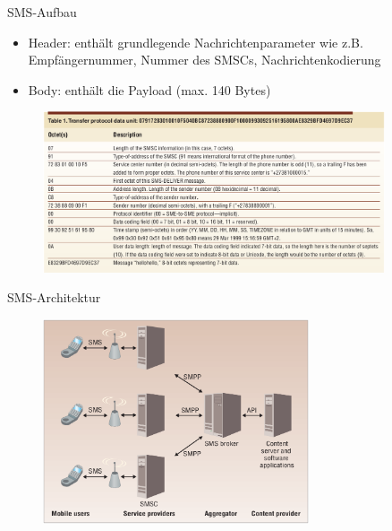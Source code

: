 \documentclass{beamer}
\begin{document}
\begin{frame}{SMS-Aufbau}
	\begin{itemize}
		\item Header: enthält grundlegende Nachrichtenparameter wie z.B. 
			Empfängernummer, Nummer des SMSCs, Nachrichtenkodierung
		\item Body: enthält die Payload (max. 140 Bytes)
	\end{itemize}
	\begin{figure}[htm]
		\includegraphics[width=0.9\textwidth]{img/tpdu-example.png}
		\label{tpdu-example}
	\end{figure}
\end{frame}

\begin{frame}{SMS-Architektur}
	\begin{figure}[htm]
		\includegraphics[width=0.7\textwidth]{img/sms-arch.png}
		\label{sms-arch}
	\end{figure}
\end{frame}
\end{document}
